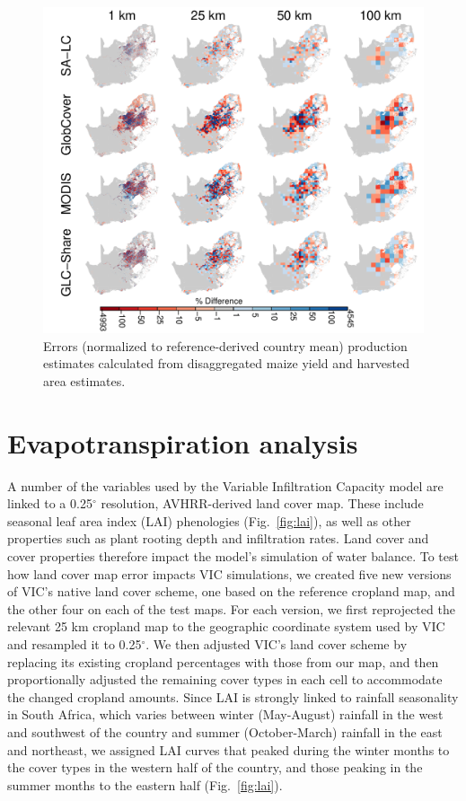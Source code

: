 \documentclass[12pt, titlepage]{article}
\begin{document}
\begin{figure}[ht]
  \centering
     \includegraphics[width = 12cm]{figures/prod_bias_map.pdf} 
      \caption{Errors (normalized to reference-derived country mean) production estimates calculated from disaggregated maize yield and harvested area estimates.}
      \label{fig:prod}
\end{figure}

\FloatBarrier


\section{\large Evapotranspiration analysis}
%
A number of the variables used by the Variable Infiltration Capacity \citep[VIC;][]{liang_simple_1994} model are linked to a 0.25$^{\circ}$ resolution, AVHRR-derived land cover map. These include seasonal leaf area index (LAI) phenologies (Fig.~\ref{fig:lai}), as well as other properties such as plant rooting depth and infiltration rates. Land cover and cover properties therefore impact the model's simulation of water balance. To test how land cover map error impacts VIC simulations, we created five new versions of VIC's native land cover scheme, one based on the reference cropland map, and the other four on each of the test maps. For each version, we first reprojected the relevant 25 km cropland map to the geographic coordinate system used by VIC and resampled it to 0.25$^{\circ}$. We then adjusted VIC's land cover scheme by replacing its existing cropland percentages with those from our map, and then proportionally adjusted the remaining cover types in each cell to accommodate the changed cropland amounts. Since LAI is strongly linked to rainfall seasonality in South Africa, which varies between winter (May-August) rainfall in the west and southwest of the country and summer (October-March) rainfall in the east and northeast, we assigned LAI curves that peaked during the winter months to the cover types in the western half of the country, and those peaking in the summer months to the eastern half (Fig.~\ref{fig:lai}). 
\end{document}
